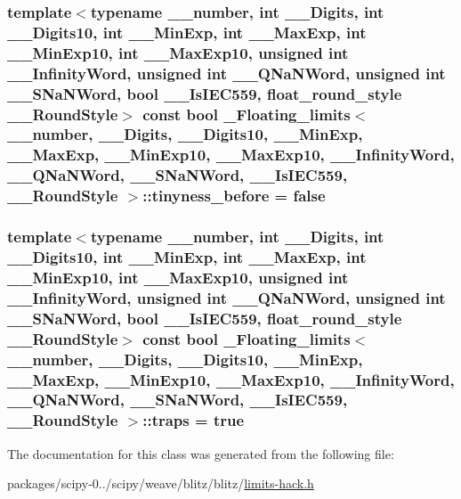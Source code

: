 \subsubsection[{tinyness\+\_\+before}]{\setlength{\rightskip}{0pt plus 5cm}template$<$typename \+\_\+\+\_\+number, int \+\_\+\+\_\+\+Digits, int \+\_\+\+\_\+\+Digits10, int \+\_\+\+\_\+\+Min\+Exp, int \+\_\+\+\_\+\+Max\+Exp, int \+\_\+\+\_\+\+Min\+Exp10, int \+\_\+\+\_\+\+Max\+Exp10, unsigned int \+\_\+\+\_\+\+Infinity\+Word, unsigned int \+\_\+\+\_\+\+Q\+Na\+N\+Word, unsigned int \+\_\+\+\_\+\+S\+Na\+N\+Word, bool \+\_\+\+\_\+\+Is\+I\+E\+C559, float\+\_\+round\+\_\+style \+\_\+\+\_\+\+Round\+Style$>$ const {\bf bool} {\bf \+\_\+\+Floating\+\_\+limits}$<$ \+\_\+\+\_\+number, \+\_\+\+\_\+\+Digits, \+\_\+\+\_\+\+Digits10, \+\_\+\+\_\+\+Min\+Exp, \+\_\+\+\_\+\+Max\+Exp, \+\_\+\+\_\+\+Min\+Exp10, \+\_\+\+\_\+\+Max\+Exp10, \+\_\+\+\_\+\+Infinity\+Word, \+\_\+\+\_\+\+Q\+Na\+N\+Word, \+\_\+\+\_\+\+S\+Na\+N\+Word, \+\_\+\+\_\+\+Is\+I\+E\+C559, \+\_\+\+\_\+\+Round\+Style $>$\+::tinyness\+\_\+before = {\bf false}\hspace{0.3cm}{\ttfamily [static]}}\label{class__Floating__limits_a92da64b8c5933b8aea8d342ce6896db8}
\hypertarget{class__Floating__limits_a2423844e1d075b7016e7225033df04db}{}
\subsubsection[{traps}]{\setlength{\rightskip}{0pt plus 5cm}template$<$typename \+\_\+\+\_\+number, int \+\_\+\+\_\+\+Digits, int \+\_\+\+\_\+\+Digits10, int \+\_\+\+\_\+\+Min\+Exp, int \+\_\+\+\_\+\+Max\+Exp, int \+\_\+\+\_\+\+Min\+Exp10, int \+\_\+\+\_\+\+Max\+Exp10, unsigned int \+\_\+\+\_\+\+Infinity\+Word, unsigned int \+\_\+\+\_\+\+Q\+Na\+N\+Word, unsigned int \+\_\+\+\_\+\+S\+Na\+N\+Word, bool \+\_\+\+\_\+\+Is\+I\+E\+C559, float\+\_\+round\+\_\+style \+\_\+\+\_\+\+Round\+Style$>$ const {\bf bool} {\bf \+\_\+\+Floating\+\_\+limits}$<$ \+\_\+\+\_\+number, \+\_\+\+\_\+\+Digits, \+\_\+\+\_\+\+Digits10, \+\_\+\+\_\+\+Min\+Exp, \+\_\+\+\_\+\+Max\+Exp, \+\_\+\+\_\+\+Min\+Exp10, \+\_\+\+\_\+\+Max\+Exp10, \+\_\+\+\_\+\+Infinity\+Word, \+\_\+\+\_\+\+Q\+Na\+N\+Word, \+\_\+\+\_\+\+S\+Na\+N\+Word, \+\_\+\+\_\+\+Is\+I\+E\+C559, \+\_\+\+\_\+\+Round\+Style $>$\+::traps = {\bf true}\hspace{0.3cm}{\ttfamily [static]}}\label{class__Floating__limits_a2423844e1d075b7016e7225033df04db}


The documentation for this class was generated from the following file\+:\begin{DoxyCompactItemize}
\item 
packages/scipy-\/0../scipy/weave/blitz/blitz/\hyperlink{limits-hack_8h}{limits-\/hack.\+h}\end{DoxyCompactItemize}
